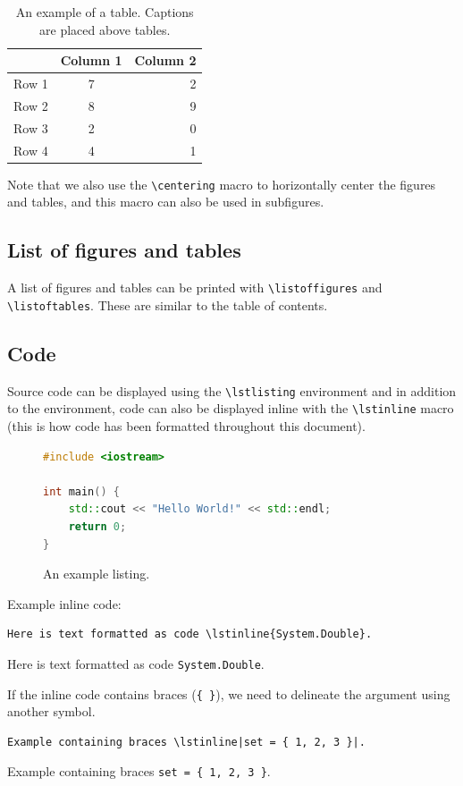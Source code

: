 \documentclass[11pt, twoside]{article}
\begin{document}
\begin{table}[H]
    \centering
    \caption{An example of a table. Captions are placed above tables.}\label{tab:table_example}
    \begin{tabular}{|l|c r|} %
        \hline %
              & Column 1 & Column 2 \\
        \hline %
        Row 1 & 7        & 2        \\
        Row 2 & 8        & 9        \\
        Row 3 & 2        & 0        \\
        Row 4 & 4        & 1        \\
        \hline %
    \end{tabular}
\end{table}
Note that we also use the \lstinline{\centering} macro to horizontally center the figures and tables, and this macro
can also be used in subfigures.
\subsection{List of figures and tables}
A list of figures and tables can be printed with \lstinline{\listoffigures} and  \lstinline{\listoftables}.
These are similar to the table of contents.
\subsection{Code}
Source code can be displayed using the \lstinline{\lstlisting} environment and in addition to the environment,
code can also be displayed inline with the \lstinline{\lstinline} macro (this is how code has been formatted throughout this document).
\begin{figure}[H]
    \caption{An example listing.}
    \begin{lstlisting}[language=c++,keywordstyle=\color{blue}]
#include <iostream>

int main() {
    std::cout << "Hello World!" << std::endl;
    return 0;
}\end{lstlisting}
\end{figure}
Example inline code:
\begin{lstlisting}
Here is text formatted as code \lstinline{System.Double}.
\end{lstlisting}
Here is text formatted as code \lstinline{System.Double}.

If the inline code contains braces (\lstinline|{ }|), we need to delineate the argument using another symbol.
\begin{lstlisting}
Example containing braces \lstinline|set = { 1, 2, 3 }|.
\end{lstlisting}
Example containing braces \lstinline|set = { 1, 2, 3 }|.
\end{document}
